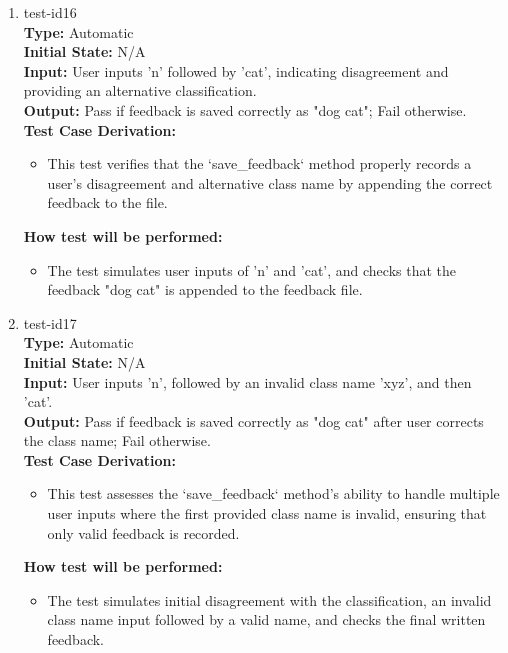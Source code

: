 \documentclass[12pt, titlepage]{article}
\begin{document}
\begin{enumerate}
\item{test-id16\\}
\textbf{Type:} Automatic\\
\textbf{Initial State:} N/A\\
\textbf{Input:} User inputs 'n' followed by 'cat', indicating disagreement and 
providing an alternative classification.\\
\textbf{Output:} Pass if feedback is saved correctly as "dog cat"; Fail otherwise.\\
\textbf{Test Case Derivation:}
\begin{itemize}
    \item This test verifies that the `save\_feedback` method properly records a 
    user's disagreement and alternative class name by appending the correct feedback to the file.
\end{itemize}
\textbf{How test will be performed:}
\begin{itemize}
    \item The test simulates user inputs of 'n' and 'cat', and checks that the 
    feedback "dog cat" is appended to the feedback file.
\end{itemize}

\item{test-id17\\}
\textbf{Type:} Automatic\\
\textbf{Initial State:} N/A\\
\textbf{Input:} User inputs 'n', followed by an invalid class name 'xyz', and then 'cat'.\\
\textbf{Output:} Pass if feedback is saved correctly as "dog cat" after user 
corrects the class name; Fail otherwise.\\
\textbf{Test Case Derivation:}
\begin{itemize}
    \item This test assesses the `save\_feedback` method's ability to handle 
    multiple user inputs where the first provided class name is invalid, 
    ensuring that only valid feedback is recorded.
\end{itemize}
\textbf{How test will be performed:}
\begin{itemize}
    \item The test simulates initial disagreement with the classification, 
    an invalid class name input followed by a valid name, and checks the final written feedback.
\end{itemize}


\end{enumerate}
\end{document}
